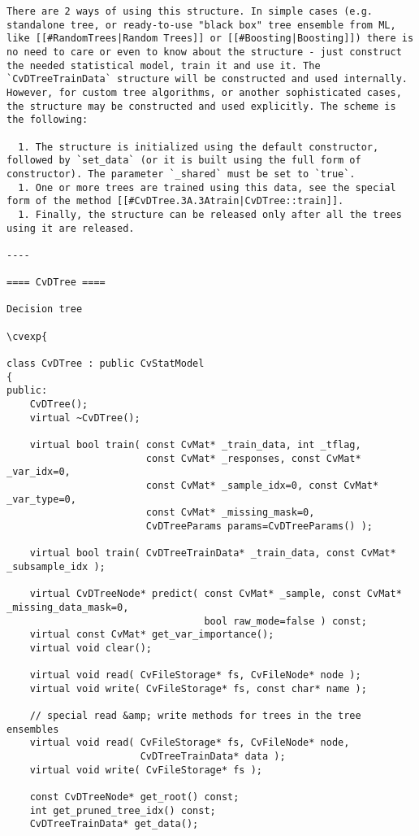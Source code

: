\begin{verbatim}
There are 2 ways of using this structure. In simple cases (e.g. standalone tree, or ready-to-use "black box" tree ensemble from ML, like [[#RandomTrees|Random Trees]] or [[#Boosting|Boosting]]) there is no need to care or even to know about the structure - just construct the needed statistical model, train it and use it. The `CvDTreeTrainData` structure will be constructed and used internally. However, for custom tree algorithms, or another sophisticated cases, the structure may be constructed and used explicitly. The scheme is the following:

  1. The structure is initialized using the default constructor, followed by `set_data` (or it is built using the full form of constructor). The parameter `_shared` must be set to `true`.
  1. One or more trees are trained using this data, see the special form of the method [[#CvDTree.3A.3Atrain|CvDTree::train]].
  1. Finally, the structure can be released only after all the trees using it are released.

----

==== CvDTree ====

Decision tree

\cvexp{

class CvDTree : public CvStatModel
{
public:
    CvDTree();
    virtual ~CvDTree();

    virtual bool train( const CvMat* _train_data, int _tflag,
                        const CvMat* _responses, const CvMat* _var_idx=0,
                        const CvMat* _sample_idx=0, const CvMat* _var_type=0,
                        const CvMat* _missing_mask=0,
                        CvDTreeParams params=CvDTreeParams() );

    virtual bool train( CvDTreeTrainData* _train_data, const CvMat* _subsample_idx );

    virtual CvDTreeNode* predict( const CvMat* _sample, const CvMat* _missing_data_mask=0,
                                  bool raw_mode=false ) const;
    virtual const CvMat* get_var_importance();
    virtual void clear();

    virtual void read( CvFileStorage* fs, CvFileNode* node );
    virtual void write( CvFileStorage* fs, const char* name );

    // special read &amp; write methods for trees in the tree ensembles
    virtual void read( CvFileStorage* fs, CvFileNode* node,
                       CvDTreeTrainData* data );
    virtual void write( CvFileStorage* fs );

    const CvDTreeNode* get_root() const;
    int get_pruned_tree_idx() const;
    CvDTreeTrainData* get_data();


\end{verbatim}
